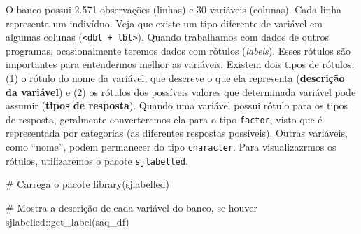 \documentclass[
  letterpaper,
  DIV=11,
  numbers=noendperiod]{scrartcl}
\newenvironment{Shaded}{\begin{snugshade}}{\end{snugshade}}
\newcommand{\CommentTok}[1]{\textcolor[rgb]{0.37,0.37,0.37}{#1}}
\newcommand{\FunctionTok}[1]{\textcolor[rgb]{0.28,0.35,0.67}{#1}}
\newcommand{\NormalTok}[1]{\textcolor[rgb]{0.00,0.23,0.31}{#1}}
\newcommand{\SpecialCharTok}[1]{\textcolor[rgb]{0.37,0.37,0.37}{#1}}
\begin{document}
O banco possui 2.571 observações (linhas) e 30 variáveis (colunas). Cada
linha representa um indivíduo. Veja que existe um tipo diferente de
variável em algumas colunas
(\texttt{\textless{}dbl\ +\ lbl\textgreater{}}). Quando trabalhamos com
dados de outros programas, ocasionalmente teremos dados com rótulos
(\emph{labels}). Esses rótulos são importantes para entendermos melhor
as variáveis. Existem dois tipos de rótulos: (1) o rótulo do nome da
variável, que descreve o que ela representa (\textbf{descrição da
variável}) e (2) os rótulos dos possíveis valores que determinada
variável pode assumir (\textbf{tipos de resposta}). Quando uma variável
possui rótulo para os tipos de resposta, geralmente converteremos ela
para o tipo \texttt{factor}, visto que é representada por categorias (as
diferentes respostas possíveis). Outras variáveis, como ``nome'', podem
permanecer do tipo \texttt{character}. Para visualizazrmos os rótulos,
utilizaremos o pacote \texttt{sjlabelled}.

\begin{Shaded}
\begin{Highlighting}[]
\CommentTok{\# Carrega o pacote}
\FunctionTok{library}\NormalTok{(sjlabelled)}
\end{Highlighting}
\end{Shaded}

\begin{Shaded}
\begin{Highlighting}[]
\CommentTok{\# Mostra a descrição de cada variável do banco, se houver}
\NormalTok{sjlabelled}\SpecialCharTok{::}\FunctionTok{get\_label}\NormalTok{(saq\_df)}
\end{Highlighting}
\end{Shaded}
\end{document}
